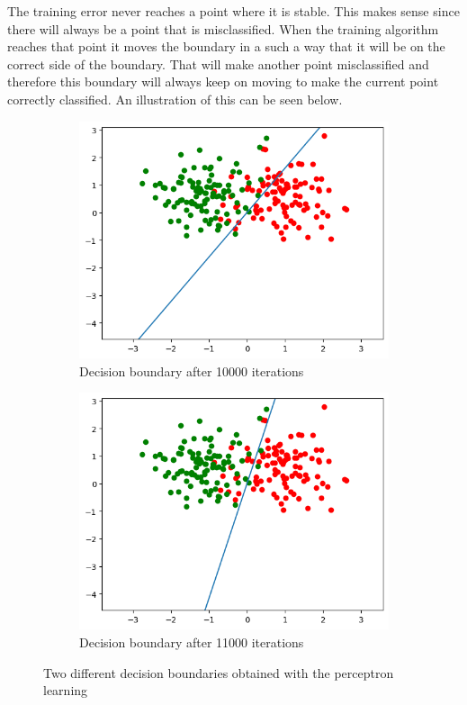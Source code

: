 \documentclass[a4paper]{article}
\begin{document}
The training error never reaches a point where it is stable. This makes sense since there will always be a point that is misclassified. When the training algorithm reaches that point it moves the boundary in a such a way that it will be on the correct side of the boundary. That will make another point misclassified and therefore this boundary will always keep on moving to make the current point correctly classified. An illustration of this can be seen below.

\begin{figure}[htb]
    \centering
    \begin{subfigure}{0.3\textwidth}
        \includegraphics[width=\textwidth]{Labs/Lab 1/Lab 1a/Results/p_non_linear10000.png}
        \caption{Decision boundary after 10000 iterations}
        \label{fig:Decision-boundary-not-linearly-separable}
    \end{subfigure}
    \hfill
    \begin{subfigure}{0.3\textwidth}
        \includegraphics[width=\textwidth]{Labs/Lab 1/Lab 1a/Results/p_non_linear11000.png}
        \caption{Decision boundary after 11000 iterations}
        \label{fig:Decision-boundary-not-linearly-separable}
    \end{subfigure}
    \caption{Two different decision boundaries obtained with the perceptron learning}
\end{figure}
\end{document}
